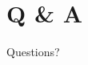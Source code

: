 \documentclass[
    fontset=fandol,
    xcolor=x11names %
]{ctexbeamer}
\begin{document}
\section{Q \& A}

\begin{frame}

    \begin{block}{Questions?}
        ~\\
        ~\\
        \\
        ~\\
        ~\\
        ~\\
        ~\\
    \end{block}

\end{frame}
\end{document}
